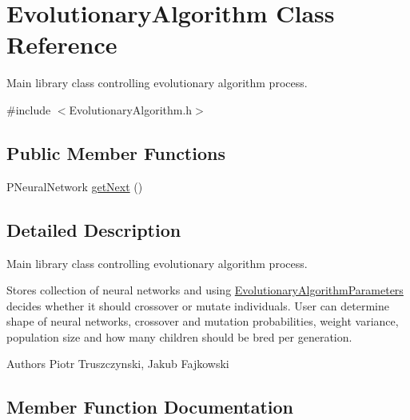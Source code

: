 \hypertarget{classEvolutionaryAlgorithm}{}\section{Evolutionary\+Algorithm Class Reference}
\label{classEvolutionaryAlgorithm}


Main library class controlling evolutionary algorithm process.  




{\ttfamily \#include $<$Evolutionary\+Algorithm.\+h$>$}

\subsection*{Public Member Functions}
\begin{DoxyCompactItemize}
\item 
P\+Neural\+Network \hyperlink{classEvolutionaryAlgorithm_ad6d0bdc4039cabff7a43e90d7ed97fa6}{get\+Next} ()
\end{DoxyCompactItemize}


\subsection{Detailed Description}
Main library class controlling evolutionary algorithm process. 

Stores collection of neural networks and using \hyperlink{structEvolutionaryAlgorithmParameters}{Evolutionary\+Algorithm\+Parameters} decides whether it should crossover or mutate individuals. User can determine shape of neural networks, crossover and mutation probabilities, weight variance, population size and how many children should be bred per generation. \begin{DoxyAuthor}{Authors}
Piotr Truszczynski, Jakub Fajkowski 
\end{DoxyAuthor}


\subsection{Member Function Documentation}
